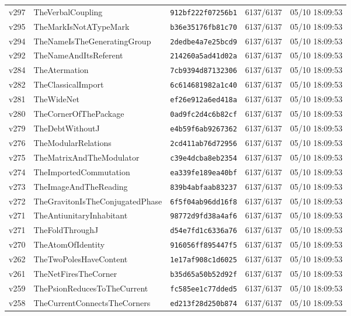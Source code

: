 \documentclass[11pt]{article}
\theoremstyle{definition}\newtheorem{deriv}{Derivation}
\begin{document}
{\begin{longtable}{@{}lllll@{}}
v297 & TheVerbalCoupling & \texttt{912bf222f07256b1} & 6137/6137 & 05/10 18:09:53 \\
v295 & TheMarkIsNotATypeMark & \texttt{b36e35176fb81c70} & 6137/6137 & 05/10 18:09:53 \\
v294 & TheNameIsTheGeneratingGroup & \texttt{2dedbe4a7e25bcd9} & 6137/6137 & 05/10 18:09:53 \\
v292 & TheNameAndItsReferent & \texttt{214260a5ad41d02a} & 6137/6137 & 05/10 18:09:53 \\
v284 & TheAtermation & \texttt{7cb9394d87132306} & 6137/6137 & 05/10 18:09:53 \\
v282 & TheClassicalImport & \texttt{6c614681982a1c40} & 6137/6137 & 05/10 18:09:53 \\
v281 & TheWideNet & \texttt{ef26e912a6ed418a} & 6137/6137 & 05/10 18:09:53 \\
v280 & TheCornerOfThePackage & \texttt{0ad9fc2d4c6b82cf} & 6137/6137 & 05/10 18:09:53 \\
v279 & TheDebtWithoutJ & \texttt{e4b59f6ab9267362} & 6137/6137 & 05/10 18:09:53 \\
v276 & TheModularRelations & \texttt{2cd411ab76d72956} & 6137/6137 & 05/10 18:09:53 \\
v275 & TheMatrixAndTheModulator & \texttt{c39e4dcba8eb2354} & 6137/6137 & 05/10 18:09:53 \\
v274 & TheImportedCommutation & \texttt{ea339fe189ea40bf} & 6137/6137 & 05/10 18:09:53 \\
v273 & TheImageAndTheReading & \texttt{839b4abfaab83237} & 6137/6137 & 05/10 18:09:53 \\
v272 & TheGravitonIsTheConjugatedPhase & \texttt{6f5f04ab96dd16f8} & 6137/6137 & 05/10 18:09:53 \\
v271 & TheAntiunitaryInhabitant & \texttt{98772d9fd38a4af6} & 6137/6137 & 05/10 18:09:53 \\
v271 & TheFoldThroughJ & \texttt{d54e7fd1c6336a76} & 6137/6137 & 05/10 18:09:53 \\
v270 & TheAtomOfIdentity & \texttt{916056ff895447f5} & 6137/6137 & 05/10 18:09:53 \\
v262 & TheTwoPolesHaveContent & \texttt{1e17af908c1d6025} & 6137/6137 & 05/10 18:09:53 \\
v261 & TheNetFiresTheCorner & \texttt{b35d65a50b52d92f} & 6137/6137 & 05/10 18:09:53 \\
v259 & ThePsionReducesToTheCurrent & \texttt{fc585ee1c77dded5} & 6137/6137 & 05/10 18:09:53 \\
v258 & TheCurrentConnectsTheCorners & \texttt{ed213f28d250b874} & 6137/6137 & 05/10 18:09:53 \\

\end{longtable}}
\end{document}
